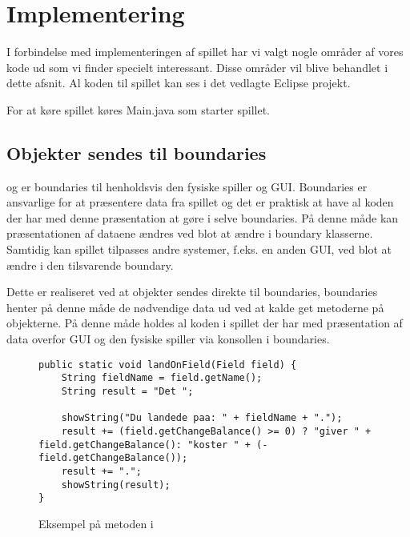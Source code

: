 \chapter{Implementering}\label{chap:implementering}
I forbindelse med implementeringen af spillet har vi valgt nogle områder af vores kode ud som vi finder specielt interessant. Disse områder vil blive behandlet i dette afsnit. Al koden til spillet kan ses i det vedlagte Eclipse projekt.

For at køre spillet køres Main.java som starter spillet.

\section{Objekter sendes til boundaries}
 og  er boundaries til henholdsvis den fysiske spiller og GUI. Boundaries er ansvarlige for at præsentere data fra spillet og det er praktisk at have al koden der har med denne præsentation at gøre i selve boundaries. På denne måde kan præsentationen af dataene ændres ved blot at ændre i boundary klasserne. Samtidig kan spillet tilpasses andre systemer, f.eks. en anden GUI, ved blot at ændre i den tilsvarende boundary.

Dette er realiseret ved at objekter sendes direkte til boundaries, boundaries henter på denne måde de nødvendige data ud ved at kalde get metoderne på objekterne. På denne måde holdes al koden i spillet der har med præsentation af data overfor GUI og den fysiske spiller via konsollen i boundaries.

\begin{figure}
\caption{Eksempel på metoden  i }
\label{fig:codeObjektEksempel}
\begin{lstlisting}
public static void landOnField(Field field) {
	String fieldName = field.getName();
	String result = "Det ";
	
	showString("Du landede paa: " + fieldName + ".");
	result += (field.getChangeBalance() >= 0) ? "giver " + field.getChangeBalance(): "koster " + (-field.getChangeBalance());
	result += ".";
	showString(result);
}
\end{lstlisting}
\end{figure}
